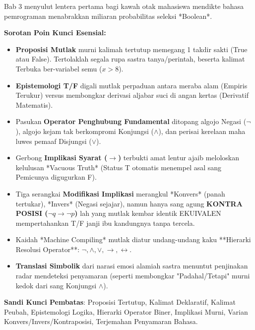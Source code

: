 \documentclass[../main]{subfiles}
\begin{document}
\begin{rangkuman}
Bab 3 menyulut lentera pertama bagi kawah otak mahasiswa mendikte bahasa pemrograman menabrakkan miliaran probabilitas seleksi *Boolean*.

\textbf{Sorotan Poin Kunci Esensial:}
\begin{itemize}
  \item \textbf{Proposisi Mutlak} murni kalimah tertutup memegang 1 takdir sakti (True atau False). Tertolaklah segala rupa sastra tanya/perintah, beserta kalimat Terbuka ber-variabel semu ($x>8$).
  \item \textbf{Epistemologi T/F} digali mutlak perpaduan antara meraba alam (Empiris Terukur) versus membongkar derivasi aljabar suci di angan kertas (Derivatif Matematis).
  \item Pasukan \textbf{Operator Penghubung Fundamental} ditopang algojo Negasi ($\neg$), algojo kejam tak berkompromi Konjungsi ($\wedge$), dan perisai kerelaan maha luwes pemaaf Disjungsi ($\vee$).
  \item Gerbong \textbf{Implikasi Syarat ($\rightarrow$)} terbukti amat lentur ajaib meloloskan kelulusan *Vacuous Truth* (Status T otomatis menempel asal sang Pemicunya digugurkan F).
  \item Tiga serangkai \textbf{Modifikasi Implikasi} merangkul *Konvers* (panah tertukar), *Invers* (Negasi sejajar), namun hanya sang agung \textbf{KONTRA POSISI ($\neg q \rightarrow \neg p$)} lah yang mutlak kembar identik EKUIVALEN mempertahankan T/F janji ibu kandungnya tanpa tercela.
  \item Kaidah *Machine Compiling* mutlak diatur undang-undang kaku **Hierarki Resolusi Operator**:  $\neg, \wedge, \vee, \rightarrow, \leftrightarrow$.
  \item \textbf{Translasi Simbolik} dari narasi emosi alamiah sastra menuntut penjinakan radar mendeteksi penyamaran (seperti membongkar "Padahal/Tetapi" murni kedok dari sang Konjungsi $\wedge$).
\end{itemize}

\textbf{Sandi Kunci Pembatas}: Proposisi Tertutup, Kalimat Deklaratif, Kalimat Peubah, Epistemologi Logika, Hierarki Operator Biner, Implikasi Murni, Varian Konvers/Invers/Kontraposisi, Terjemahan Penyamaran Bahasa.
\end{rangkuman}

\ifSubfilesClassLoaded{
  \renewcommand{\bibname}{Daftar Pustaka}
  
  
}{}
\end{document}

